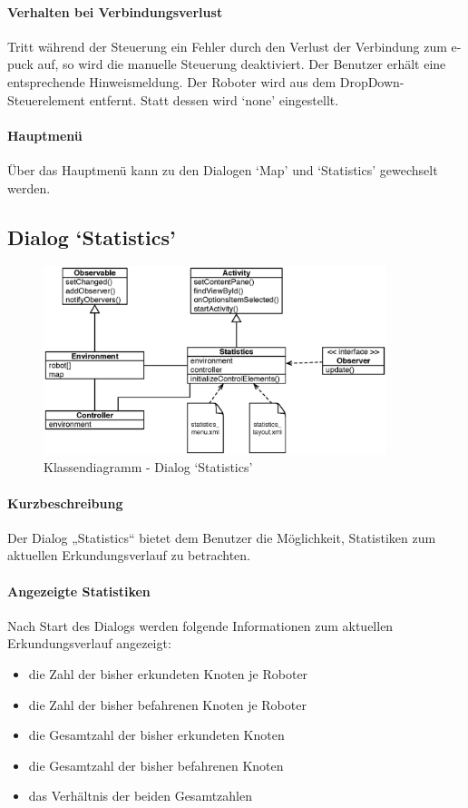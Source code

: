 \documentclass[10pt,a4paper]{article}
\begin{document}
	\paragraph*{Verhalten bei Verbindungsverlust} Tritt während der Steuerung ein Fehler durch den Verlust der Verbindung zum e-puck auf, so wird die
	manuelle Steuerung deaktiviert. Der Benutzer erhält eine entsprechende Hinweismeldung. Der Roboter wird aus dem DropDown-Steuerelement entfernt.
	Statt dessen wird `none' eingestellt.
	
	\paragraph*{Hauptmenü} Über das Hauptmenü kann zu den Dialogen `Map' und `Statistics' gewechselt werden.
	
	\subsection*{Dialog `Statistics'}
	
	\begin{figure}[h]
			\centering
			\includegraphics[width=10cm]{images/entwurf_statistics.eps}
  			\caption{Klassendiagramm - Dialog `Statistics'}
  			\label{fig:dialog_statistics}
  	\end{figure}
	
	\paragraph*{Kurzbeschreibung} Der Dialog „Statistics“ bietet dem Benutzer die Möglichkeit, Statistiken zum aktuellen Erkundungsverlauf zu
	betrachten.
	
	\paragraph*{Angezeigte Statistiken} Nach Start des Dialogs werden folgende Informationen zum aktuellen Erkundungsverlauf angezeigt:
	\begin{itemize}
	\item die Zahl der bisher erkundeten Knoten je Roboter
	\item die Zahl der bisher befahrenen Knoten je Roboter
	\item die Gesamtzahl der bisher erkundeten Knoten
	\item die Gesamtzahl der bisher befahrenen Knoten
	\item das Verhältnis der beiden Gesamtzahlen
	\end{itemize}
	
\end{document}
